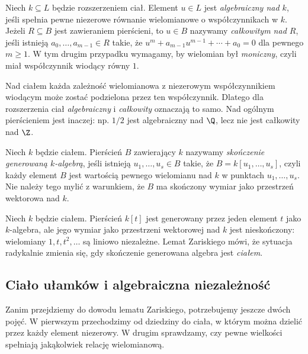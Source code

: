 \begin{definicja}
Niech $k\subseteq L$ będzie rozszerzeniem ciał. Element $u\in L$
jest \emph{algebraiczny nad $k$}, jeśli spełnia pewne niezerowe
równanie wielomianowe o współczynnikach w $k$.
Jeżeli $R\subseteq B$ jest zawieraniem pierścieni, to $u\in B$
nazywamy \emph{całkowitym nad $R$}, jeśli istnieją
$a_0,\dots,a_{m-1}\in R$ takie, że
$u^m+a_{m-1}u^{m-1}+\cdots+a_0=0$ dla pewnego $m\ge1$.
W tym drugim przypadku wymagamy, by wielomian był \emph{moniczny},
czyli miał współczynnik wiodący równy $1$.
\end{definicja}

Nad ciałem każda zależność wielomianowa z niezerowym
współczynnikiem wiodącym może zostać podzielona przez ten współczynnik.
Dlatego dla rozszerzenia ciał \emph{algebraiczny} i
\emph{całkowity} oznaczają to samo. Nad ogólnym pierścieniem jest
inaczej: np. $1/2$ jest algebraiczny nad $\Q$, lecz nie jest
całkowity nad $\Z$.

\begin{definicja}
Niech $k$ będzie ciałem. Pierścień $B$ zawierający $k$
nazywamy \emph{skończenie generowaną $k$-algebrą}, jeśli
istnieją $u_1,\dots,u_s\in B$ takie, że
$B=k[u_1,\dots,u_s]$, czyli każdy element $B$ jest
wartością pewnego wielomianu nad $k$ w punktach $u_1,\dots,u_s$.
Nie należy tego mylić z warunkiem, że $B$ ma skończony wymiar
jako przestrzeń wektorowa nad $k$.
\end{definicja}

\begin{przyklad}
Niech $k$ będzie ciałem. Pierścień $k[t]$ jest generowany przez jeden element $t$
jako $k$-algebra, ale jego wymiar jako przestrzeni wektorowej
nad $k$ jest nieskończony: wielomiany $1,t,t^2,\dots$
są liniowo niezależne. Lemat Zariskiego mówi, że sytuacja
radykalnie zmienia się, gdy skończenie generowana algebra
jest \emph{ciałem}.
\end{przyklad}

\subsection{Ciało ułamków i algebraiczna niezależność}

Zanim przejdziemy do dowodu lematu Zariskiego, potrzebujemy jeszcze
dwóch pojęć. W pierwszym przechodzimy od dziedziny do ciała,
w którym można dzielić przez każdy element niezerowy.
W drugim sprawdzamy, czy pewne wielkości spełniają jakąkolwiek
relację wielomianową.

